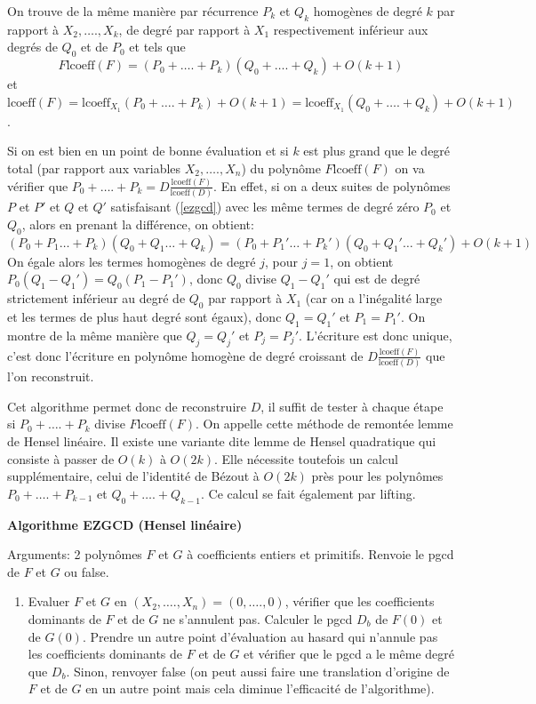 \documentclass[a4paper,11pt]{article}
\begin{document}
\begin{giacjshere}
On trouve de la même manière par récurrence $P_k$ et $Q_k$ homogènes de degré
$k$ par rapport à $X_2, \ldots ., X_k$, de degré par rapport à $X_1$
respectivement inférieur aux degrés de $Q_0$ et de $P_0$ et tels que
\begin{equation}
  F \mbox{lcoeff} ( F ) = ( P_0 + \ldots . + P_k ) ( Q_0 + \ldots . + Q_k ) +
  O ( k + 1  ) \label{ezgcd}
\end{equation}
et $\mbox{lcoeff} ( F ) = \mbox{lcoeff}_{X_1} ( P_0 + \ldots . + P_k ) + O ( k
+ 1 ) = \mbox{lcoeff}_{X_1} ( Q_0 + \ldots . + Q_k ) + O ( k + 1 )$.

Si on est bien en un point de bonne évaluation et si $k$ est plus grand que le
degré total (par rapport aux variables $X_2, \ldots ., X_n$) du polynôme
 $F \mbox{lcoeff} ( F )$ on va vérifier que $P_0 + \ldots . + P_k = D
\frac{\mbox{lcoeff} ( F )}{\mbox{lcoeff} ( D )}$. En effet, si on a deux
suites de polynômes $P$ et $P'$ et $Q$ et $Q'$ satisfaisant (\ref{ezgcd}) avec
les même termes de degré zéro $P_0$ et $Q_0$, alors en prenant la différence,
on obtient:
\[ ( P_0 + P_1 \ldots  + P_k ) ( Q_0 + Q_1 \ldots  + Q_k ) = ( P_0 + P_1'
   \ldots  + P_k' ) ( Q_0 + Q_1' \ldots  + Q_k' ) + O ( k + 1 ) \]
On égale alors les termes homogènes de degré $j$, pour $j = 1$, on obtient
$P_0 ( Q_1 - Q_1' ) = Q_0 ( P_1 - P_1' )$, donc $Q_0$ divise $Q_1 - Q_1'$ qui
est de degré strictement inférieur au degré de $Q_0$ par rapport à $X_1$ (car
on a l'inégalité large et les termes de plus haut degré sont égaux),
donc $Q_1 = Q_1'$ et $P_1 = P_1'$. On montre de la même manière que $Q_j =
Q_j'$ et $P_j = P_j'$. L'écriture est donc unique, c'est donc l'écriture en
polynôme homogène de degré croissant de $D \frac{\mbox{lcoeff} ( F
)}{\mbox{lcoeff} ( D )}$ que l'on reconstruit.

Cet algorithme permet donc de reconstruire $D$, il suffit de tester à chaque
étape si $P_0 + \ldots . + P_k$ divise $F \mbox{lcoeff} ( F )$. On appelle
cette méthode de remontée lemme de Hensel linéaire. Il existe une variante
dite lemme de Hensel quadratique qui consiste à passer de $O ( k )$ à $O ( 2 k
)$. Elle nécessite toutefois un calcul supplémentaire, celui de l'identité de
Bézout à $O ( 2 k )$ près pour les polynômes $P_0 + \ldots . + P_{k - 1}$ et
$Q_0 + \ldots . + Q_{k - 1}$. Ce calcul se fait également par lifting.

{\bf{Algorithme EZGCD (Hensel linéaire)}}

Arguments: 2 polynômes $F$ et $G$ à coefficients entiers et primitifs. Renvoie
le pgcd de $F$ et $G$ ou false.
\begin{enumerate}
  \item Evaluer $F$ et $G$ en $( X_2, \ldots ., X_n ) = ( 0, \ldots ., 0 )$,
  vérifier que les coefficients dominants de $F$ et de $G$ ne s'annulent pas.
  Calculer le pgcd $D_b$ de $F ( 0 )$ et de $G ( 0 )$. Prendre un autre point
  d'évaluation au hasard qui n'annule pas les coefficients dominants de $F$ et
  de $G$ et vérifier que le pgcd a le même degré que $D_b$. Sinon, renvoyer
  false (on peut aussi faire une translation d'origine de $F$ et de $G$ en un
  autre point mais cela diminue l'efficacité de l'algorithme).
  

\end{enumerate}
\end{giacjshere}
\end{document}

